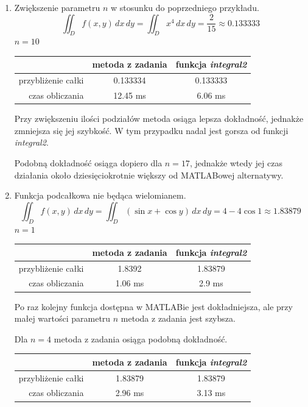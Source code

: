 \documentclass[12pt]{article}
\begin{document}
\begin{enumerate}[label=\textbf{Przykład \arabic*}]
		
		\item
		Zwiększenie parametru $n$ w stosunku do poprzedniego przykładu.
		$$\iint_D f(x, y) \,dx\,dy = \iint_D x^4 \,dx\,dy = \frac{2}{15} \approx 0.133333$$
		$n = 10$
		
		\begin{table}[H]
			\centering
			\begin{tabular}{|r|c|c|}
				\hline
				                   & metoda z zadania & funkcja \textit{integral2} \\ \hline
				przybliżenie całki &     0.133334     &          0.133333          \\ \hline
				   czas obliczania &     12.45 ms     &          6.06 ms           \\ \hline
			\end{tabular}
		\end{table}
	
		Przy zwiększeniu ilości podziałów metoda osiąga lepsza dokładność, jednakże zmniejsza się jej szybkość. W tym przypadku nadal jest gorsza od funkcji \textit{integral2}.
		
		Podobną dokładność osiąga dopiero dla $n = 17$, jednakże wtedy jej czas działania około dziesięciokrotnie większy od MATLABowej alternatywy.
		
		
		\item
		Funkcja podcałkowa nie będąca wielomianem.
		$$\iint_D f(x, y) \,dx\,dy = \iint_D (\sin x + \cos y) \,dx\,dy = 4 - 4\cos 1 \approx 1.83879$$
		$n = 1$
		
		\begin{table}[H]
			\centering
			\begin{tabular}{|r|c|c|}
				\hline
				                   & metoda z zadania & funkcja \textit{integral2} \\ \hline
				przybliżenie całki &      1.8392      &          1.83879           \\ \hline
				   czas obliczania &     1.06 ms      &           2.9 ms           \\ \hline
			\end{tabular}
		\end{table}
		
		Po raz kolejny funkcja dostępna w MATLABie jest dokładniejsza, ale przy małej wartości parametru $n$ metoda z zadania jest szybsza.
		
		Dla $n = 4$ metoda z zadania osiąga podobną dokładność.
		\begin{table}[H]
			\centering
			\begin{tabular}{|r|c|c|}
				\hline
				                   & metoda z zadania & funkcja \textit{integral2} \\ \hline
				przybliżenie całki &     1.83879      &          1.83879           \\ \hline
				   czas obliczania &     2.96 ms      &          3.13 ms           \\ \hline
			\end{tabular}
		\end{table}
	

\end{enumerate}
\end{document}

